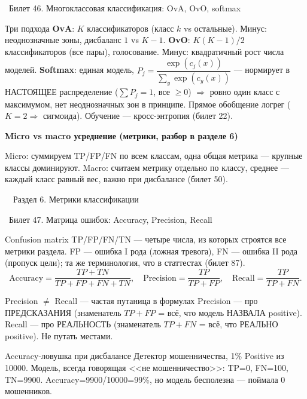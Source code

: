 \documentclass[12pt, a4paper]{article}
\newcommand{\razdel}[2]{%
  \clearpage%
  \noindent\colorbox{razdelcol}{\parbox{\dimexpr\linewidth-2\fboxsep\relax}{%
    \color{white}\LARGE\bfseries\strut\ \ Раздел #1. #2%
  }}%
  \vspace{10pt}%
}
\newcommand{\bilet}[2]{%
  \vspace{10pt}%
  \noindent\colorbox{qcolor}{\parbox{\dimexpr\linewidth-2\fboxsep\relax}{%
    \color{white}\large\bfseries\strut\ Билет #1. #2%
  }}%
  \nopagebreak\vspace{5pt}\par\nopagebreak%
}
\newcommand{\qsub}[1]{%
  \vspace{5pt}%
  {\bfseries\color{defblue} #1}%
  \par\vspace{2pt}%
}
\begin{document}
\bilet{46}{Многоклассовая классификация: OvA, OvO, softmax}

\begin{defbox}{Три подхода}
\textbf{OvA}: $K$ классификаторов (класс $k$ vs остальные). Минус: неоднозначные зоны, дисбаланс $1$ vs $K{-}1$.
\textbf{OvO}: $K(K-1)/2$ классификаторов (все пары), голосование. Минус: квадратичный рост числа моделей.
\textbf{Softmax}: единая модель, $P_j=\dfrac{\exp(c_j(x))}{\sum_y\exp(c_y(x))}$ --- нормирует в НАСТОЯЩЕЕ распределение ($\sum P_j=1$, все $\ge0$) $\Rightarrow$ ровно один класс с максимумом, нет неоднозначных зон в принципе. Прямое обобщение логрег ($K=2\Rightarrow$ сигмоида). Обучение --- кросс-энтропия (билет 22).
\end{defbox}

\qsub{Micro vs macro усреднение (метрики, разбор в разделе 6)}
Micro: суммируем TP/FP/FN по всем классам, одна общая метрика --- крупные классы доминируют. Macro: считаем метрику отдельно по классу, среднее --- каждый класс равный вес, важно при дисбалансе (билет 50).

\razdel{6}{Метрики классификации}

\bilet{47}{Матрица ошибок: Accuracy, Precision, Recall}

\begin{defbox}{Confusion matrix}
TP/FP/FN/TN --- четыре числа, из которых строятся все метрики раздела. FP --- ошибка I рода (ложная тревога), FN --- ошибка II рода (пропуск цели); та же терминология, что в статтестах (билет 87).
\[
  \text{Accuracy}=\frac{TP+TN}{TP+FP+FN+TN}, \quad \text{Precision}=\frac{TP}{TP+FP}, \quad \text{Recall}=\frac{TP}{TP+FN}.
\]
\end{defbox}

\begin{rembox}{Precision $\ne$ Recall --- частая путаница в формулах}
Precision --- про ПРЕДСКАЗАНИЯ (знаменатель $TP+FP$ = всё, что модель НАЗВАЛА positive). Recall --- про РЕАЛЬНОСТЬ (знаменатель $TP+FN$ = всё, что РЕАЛЬНО positive). Не путать местами.
\end{rembox}

\begin{exbox}{Accuracy-ловушка при дисбалансе}
Детектор мошенничества, 1\% Positive из 10000. Модель, всегда говорящая <<не мошенничество>>: TP=0, FN=100, TN=9900. Accuracy=9900/10000=99\%, но модель бесполезна --- поймала 0 мошенников.
\end{exbox}
\end{document}
